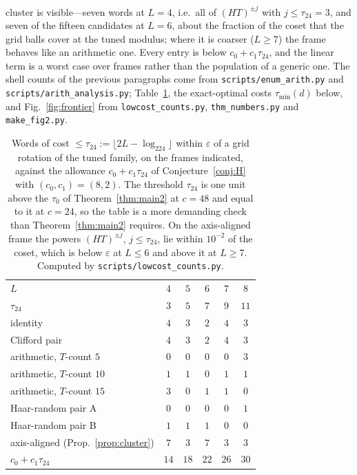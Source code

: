 \documentclass[aps,prx,twocolumn,superscriptaddress,nofootinbib,longbibliography]{revtex4-2}
\theoremstyle{plain}
\theoremstyle{definition}
\theoremstyle{remark}
\begin{document}
cluster is visible---seven words at $L=4$, i.e.\ all of $(HT)^{\pm j}$ with $j\le\tau_{24}=3$, and seven of the fifteen candidates at $L=6$, about the fraction of the coset that the grid balls cover at the tuned modulus; where it is coarser ($L\ge7$) the frame behaves like an arithmetic one. Every entry is below $c_0+c_1\tau_{24}$, and the linear term is a worst case over frames rather than the population of a generic one. The shell counts of the previous paragraphs come from \texttt{scripts/enum\_arith.py} and \texttt{scripts/arith\_analysis.py}; Table~\ref{tab:lowcost}, the exact-optimal costs $\tau_{\min}(d)$ below, and Fig.~\ref{fig:frontier} from \texttt{lowcost\_counts.py}, \texttt{thm\_numbers.py} and \texttt{make\_fig2.py}.
\begin{table}[t]
\centering\footnotesize
\caption{Words of cost $\le\tau_{24}:=\lfloor2L-\log_224\rfloor$ within $\varepsilon$ of a grid rotation of the tuned family, on the frames indicated, against the allowance $c_0+c_1\tau_{24}$ of Conjecture~\ref{conj:H} with $(c_0,c_1)=(8,2)$. The threshold $\tau_{24}$ is one unit above the $\tau_0$ of Theorem~\ref{thm:main2} at $c=48$ and equal to it at $c=24$, so the table is a more demanding check than Theorem~\ref{thm:main2} requires. On the axis-aligned frame the powers $(HT)^{\pm j}$, $j\le\tau_{24}$, lie within $10^{-2}$ of the coset, which is below $\varepsilon$ at $L\le6$ and above it at $L\ge7$. Computed by \texttt{scripts/lowcost\_counts.py}.}
\label{tab:lowcost}
\setlength{\tabcolsep}{4pt}\begin{tabular}{@{}l ccccc@{}}
\toprule
$L$ & $4$ & $5$ & $6$ & $7$ & $8$\\
$\tau_{24}$ & $3$ & $5$ & $7$ & $9$ & $11$\\
\midrule
identity & $4$ & $3$ & $2$ & $4$ & $3$\\
Clifford pair & $4$ & $3$ & $2$ & $4$ & $3$\\
arithmetic, $T$-count $5$ & $0$ & $0$ & $0$ & $0$ & $3$\\
arithmetic, $T$-count $10$ & $1$ & $1$ & $0$ & $1$ & $1$\\
arithmetic, $T$-count $15$ & $3$ & $0$ & $1$ & $1$ & $0$\\
Haar-random pair A & $0$ & $0$ & $0$ & $0$ & $1$\\
Haar-random pair B & $1$ & $1$ & $1$ & $0$ & $0$\\
axis-aligned (Prop.~\ref{prop:cluster}) & $7$ & $3$ & $7$ & $3$ & $3$\\
\midrule
$c_0+c_1\tau_{24}$ & $14$ & $18$ & $22$ & $26$ & $30$\\
\bottomrule
\end{tabular}
\end{table}
\end{document}
